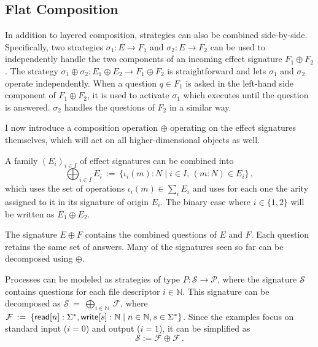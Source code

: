 \subsection{Flat Composition}
In addition to layered composition,
strategies can also be combined side-by-side.
Specifically, two strategies
$\sigma_1 : E \rightarrow F_1$ and
$\sigma_2 : E \rightarrow F_2$
can be used to independently handle
the two components of an incoming effect signature $F_1 \oplus F_2$.
The strategy
$\sigma_1 \oplus \sigma_2 : E_1 \oplus E_2 \rightarrow F_1 \oplus F_2$
is straightforward and lets $\sigma_1$ and $\sigma_2$ operate independently.
When a question $q \in F_1$ is asked
in the left-hand side component of $F_1 \oplus F_2$,
it is used to activate $\sigma_1$ which executes
until the question is answered.
$\sigma_2$ handles the questions of $F_2$ in a similar way.

I now introduce
a composition operation $\oplus$ operating on the effect signatures themselves,
which will act on all higher-dimensional objects as well.

\begin{definition}
  A family $(E_i)_{i \in I}$ of effect signatures can be combined into
  \[
    \bigoplus_{i \in I} E_i \, := \,
    \{ \iota_i(m) \mathbin: N \mid i \in I,\, (m \mathbin: N) \in E_i \}
    \,,
  \]
  which uses the set of operations $\iota_i(m) \in \sum_i E_i$
  and uses for each one the arity assigned to it
  in its signature of origin $E_i$.
  The binary case where $i \in \{1, 2\}$
  will be written as $E_1 \oplus E_2$.
\end{definition}

The signature $E \oplus F$ contains the combined questions of $E$ and $F$.
Each question retains the same set of answers.
Many of the signatures seen so far can be decomposed using $\oplus$.

\begin{example}
  Processes can be modeled as
  strategies of type $P : \mathcal{S} \rightarrow \mathcal{P}$,
  where the signature $\mathcal{S}$ contains questions for
  each file descriptor $i \in \mathbb{N}$.
  This signature can be decomposed as
  $
  \mathcal{S} \: = \: \bigoplus_{i \in \mathbb{N}} \: \mathcal{F}
  $, where $
  \mathcal{F} \: := \:
  \{  \mathsf{read} [n] : \Sigma^*,  \mathsf{write} [s] : \mathbb{N} \mid n \in \mathbb{N}, s \in \Sigma^* \}
  $.
  Since the examples focus on standard input ($i=0$) and output ($i=1$),
  it can be simplified as
  \[\mathcal{S} := \mathcal{F} \oplus \mathcal{F}\,.\]
\end{example}


